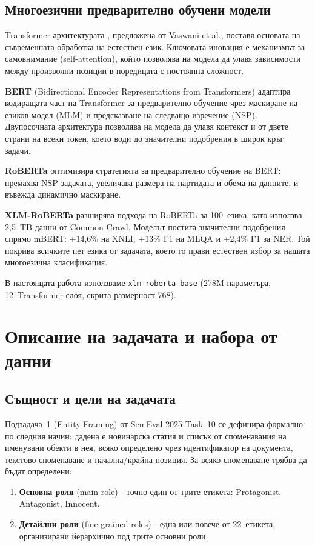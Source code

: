 \documentclass[12pt,a4paper]{report}
\begin{document}
\section{Многоезични предварително обучени модели}

Transformer архитектурата \cite{vaswani2017attention}, предложена от Vaswani et al., поставя основата на съвременната обработка на естествен език. Ключовата иновация е механизмът за самовнимание (self-attention), който позволява на модела да улавя зависимости между произволни позиции в поредицата с постоянна сложност.

\textbf{BERT} (Bidirectional Encoder Representations from Transformers) \cite{devlin2019bert} адаптира кодиращата част на Transformer за предварително обучение чрез маскиране на езиков модел (MLM) и предсказване на следващо изречение (NSP). Двупосочната архитектура позволява на модела да улавя контекст и от двете страни на всеки токен, което води до значителни подобрения в широк кръг задачи.

\textbf{RoBERTa} \cite{liu2019roberta} оптимизира стратегията за предварително обучение на BERT: премахва NSP задачата, увеличава размера на партидата и обема на данните, и въвежда динамично маскиране.

\textbf{XLM-RoBERTa} \cite{conneau2020xlmr} разширява подхода на RoBERTa за 100~езика, като използва 2,5~TB данни от Common Crawl. Моделът постига значителни подобрения спрямо mBERT: +14,6\% на XNLI, +13\% F1 на MLQA и +2,4\% F1 за NER. Той покрива всичките пет езика от задачата, което го прави естествен избор за нашата многоезична класификация.

В настоящата работа използваме \texttt{xlm-roberta-base} (278M параметъра, 12~Transformer слоя, скрита размерност 768).


\chapter{Описание на задачата и набора от данни}

\section{Същност и цели на задачата}

Подзадача~1 (Entity Framing) от SemEval-2025 Task~10 \cite{piskorski2025semeval} се дефинира формално по следния начин: дадена е новинарска статия и списък от споменавания на именувани обекти в нея, всяко определено чрез идентификатор на документа, текстово споменаване и начална/крайна позиция. За всяко споменаване трябва да бъдат определени:
\begin{enumerate}
  \item \textbf{Основна роля} (main role) - точно един от трите етикета: Protagonist, Antagonist, Innocent.
  \item \textbf{Детайлни роли} (fine-grained roles) - една или повече от 22~етикета, организирани йерархично под трите основни роли.
\end{enumerate}
\end{document}
